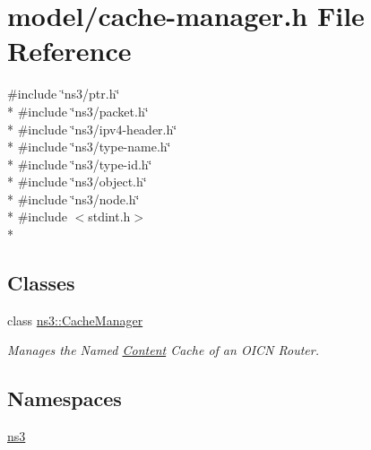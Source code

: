 \hypertarget{cache-manager_8h}{\section{model/cache-\/manager.h File Reference}
\label{cache-manager_8h}
}
{\ttfamily \#include \char`\"{}ns3/ptr.\-h\char`\"{}}\\*
{\ttfamily \#include \char`\"{}ns3/packet.\-h\char`\"{}}\\*
{\ttfamily \#include \char`\"{}ns3/ipv4-\/header.\-h\char`\"{}}\\*
{\ttfamily \#include \char`\"{}ns3/type-\/name.\-h\char`\"{}}\\*
{\ttfamily \#include \char`\"{}ns3/type-\/id.\-h\char`\"{}}\\*
{\ttfamily \#include \char`\"{}ns3/object.\-h\char`\"{}}\\*
{\ttfamily \#include \char`\"{}ns3/node.\-h\char`\"{}}\\*
{\ttfamily \#include $<$stdint.\-h$>$}\\*
\subsection*{Classes}
\begin{DoxyCompactItemize}
\item 
class \hyperlink{classns3_1_1CacheManager}{ns3\-::\-Cache\-Manager}
\begin{DoxyCompactList}\small\item\em Manages the Named \hyperlink{classns3_1_1Content}{Content} Cache of an O\-I\-C\-N Router. \end{DoxyCompactList}\end{DoxyCompactItemize}
\subsection*{Namespaces}
\begin{DoxyCompactItemize}
\item 
\hyperlink{namespacens3}{ns3}
\end{DoxyCompactItemize}
